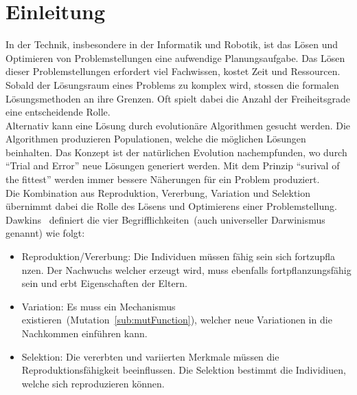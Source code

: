 %
%


\chapter{Einleitung}

  In der Technik, insbesondere in der Informatik und Robotik,
  ist das Lösen und Optimieren von Problemstellungen eine aufwendige Planungsaufgabe.
  Das Lösen dieser Problemstellungen erfordert viel Fachwissen, kostet Zeit und Ressourcen.
  Sobald der Lösungsraum eines Problems zu komplex wird, stossen die formalen Lösungsmethoden an ihre Grenzen.
  Oft spielt dabei die Anzahl der Freiheitsgrade eine entscheidende Rolle.
  \\
  Alternativ kann eine Lösung durch evolutionäre Algorithmen gesucht werden.
  Die Algorithmen produzieren Populationen, welche die möglichen Lösungen beinhalten.
  Das Konzept ist der natürlichen Evolution nachempfunden, wo durch ``Trial and Error'' neue Lösungen generiert werden.
  Mit dem Prinzip ``surival of the fittest'' werden immer bessere Näherungen für ein Problem produziert.
  \\
  Die Kombination aus Reproduktion, Vererbung, Variation und Selektion
  übernimmt dabei die Rolle des Lösens und Optimierens einer Problemstellung.
  \\
  Dawkins~\cite{book:universalDarwinism} definiert die vier Begrifflichkeiten~(auch universeller Darwinismus genannt) wie folgt:

  \begin{itemize}

    \item Reproduktion/Vererbung: Die Individuen müssen fähig sein sich fortzupfla nzen.
      Der Nachwuchs welcher erzeugt wird, muss ebenfalls fortpflanzungsfähig sein und erbt Eigenschaften der Eltern.

    \item Variation: Es muss ein Mechanismus existieren~(Mutation~\vref{sub:mutFunction}),
      welcher neue Variationen in die Nachkommen einführen kann.

    \item Selektion: Die vererbten und variierten Merkmale müssen die Reproduktionsfähigkeit beeinflussen.
      Die Selektion bestimmt die Individiuen, welche sich reproduzieren können.

  \end{itemize}

